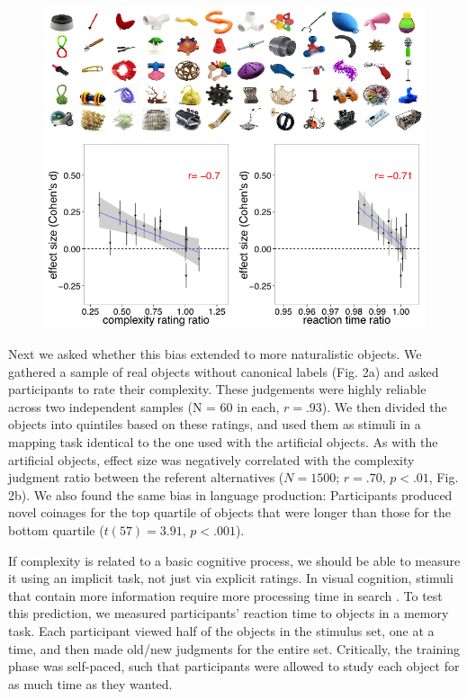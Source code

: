 \documentclass[12pt]{article}
\begin{document}
\begin{figure}[t]
\begin{center}
\includegraphics[scale = .5]{figs/real_objs_cropped.png}
\caption{}
\end{center}
\label{fig:real_objs}
\end{figure}

Next we asked whether this bias extended to more naturalistic objects. We gathered a sample of real objects without canonical labels (Fig. 2a) and asked participants to rate their complexity. These judgements were highly reliable across two independent samples (N = 60 in each, $r = .93$). We then divided the objects into quintiles based on these ratings, and used them as stimuli in a mapping task identical to the one used with the artificial objects. As with the artificial objects, effect size was negatively correlated with the complexity judgment ratio between the referent alternatives ($N = 1500$; $r = .70$, $p < .01$, Fig. 2b). We also found the same bias in language production: Participants produced novel coinages for the top quartile of objects that were longer than those for the bottom quartile ($t(57) = 3.91$, $p < .001$). 
					
If complexity is related to a basic cognitive process, we should be able to measure it using an implicit task, not just via explicit ratings. In visual cognition, stimuli that contain more information require more processing time in search \cite{alvarez2004}. To test this prediction, we measured participants' reaction time to objects in a memory task. Each participant viewed half of the objects in the stimulus set, one at a time, and then made old/new judgments for the entire set. Critically, the training phase was self-paced, such that participants were allowed to study each object for as much time as they wanted. 
					
\end{document}
